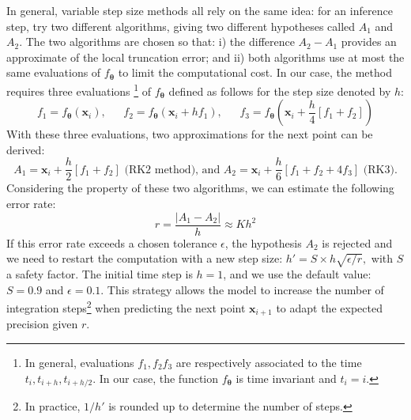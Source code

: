 \documentclass{article}
\newcommand{\x}{\ensuremath{\mathbf{x}}} %
\newcommand{\eps}{\ensuremath{\epsilon}}
\newcommand{\params}{\ensuremath{\boldsymbol{\theta}}}
\newcommand{\nnet}{\ensuremath{f_{\params}}}
\begin{document}
In general, variable step size methods all rely on the same idea: for
an inference step, try two different algorithms, giving two different
hypotheses called $A_1$ and $A_2$. The two algorithms are chosen so that:
i) the difference $A_2-A_1$ provides an approximate of the local
truncation error; and ii) both algorithms use at most the same
evaluations of $\nnet$ to limit the computational cost.  In our case,
the method requires three evaluations \footnote{In
  general, evaluations $f_1,f_2f_3$ are respectively associated to the
  time $t_i,t_{i+h},t_{i+h/2}$. In our case, the function $\nnet$ is
  time invariant and $t_i=i$. } of $\nnet$ defined as follows for the step size denoted by $h$:
\begin{equation*}
f_1 = \nnet(\x_i),\phantom{5ex} 
f_2 = \nnet(\x_i+hf_1), \phantom{5ex} 
f_3 = \nnet(\x_i+\frac{h}{4}[f_1+f_2])
\end{equation*}
With these three evaluations, two approximations for the next point can be derived: 
\begin{equation}
  \label{eq:hyps}
   A_1 = \x_i+\frac{h}{2}[f_1+f_2] \text{ (RK2 method), and } A_2 = \x_i+\frac{h}{6}[f_1+f_2+4f_3] \text{ (RK3).} 
\end{equation}
Considering the property of these two algorithms, we can estimate the
following error rate:
\begin{equation}
  \label{eq:error}
  r = \frac{|A_1-A_2|}{h} \approx Kh^2
\end{equation}
If this error rate exceeds a chosen tolerance $\eps$, the hypothesis
$A_2$ is rejected and we need to restart the computation with a new
step size: $ h'= S \times h\sqrt{\epsilon/r}, $ with $S$ a safety
factor. The initial time step is $h=1$, and we use the default value:
$S=0.9$ and $\eps=0.1$. This strategy allows the model to increase the number
of integration steps\footnote{In practice, $1/h'$ is rounded up to
  determine the number of steps.} when predicting the next point
$\x_{i+1}$ to adapt the expected precision given $r$.
\end{document}
